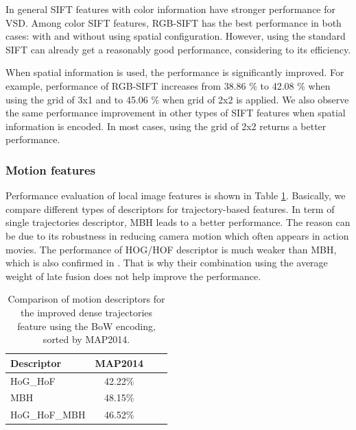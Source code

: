 \documentclass[twocolumn]{bmcart}%
\begin{document}
In general SIFT features with color information have stronger performance for VSD. Among color SIFT features, RGB-SIFT has the best performance in both cases: with and without using spatial configuration. However, using the standard SIFT can already get a reasonably good performance, considering to its efficiency. 

When spatial information is used, the performance is significantly improved. For example, performance of RGB-SIFT increases from 38.86 \%  to 42.08 \% when using the grid of 3x1 and to 45.06 \% when grid of 2x2 is applied. We also observe the same performance improvement in other types of SIFT features when spatial information is encoded. In most cases, using the grid of 2x2 returns a better performance. 

\subsubsection{Motion features}
Performance evaluation of local image features is shown in Table \ref{tab:motion_bow}. Basically, we compare different types of descriptors for trajectory-based features. In term of single trajectories descriptor, MBH leads to a better performance. The reason can be due to its robustness in reducing camera motion which often appears in action movies. The performance of HOG/HOF descriptor is much weaker than MBH, which is also confirmed in \cite{wang2013action}. That is why their combination using the average weight of late fusion does not help improve the performance.
\begin{table}
	\centering
	\caption{Comparison of motion descriptors for the improved dense trajectories feature using the BoW encoding, sorted by MAP2014.}
	\begin{tabular}{lccc}
		\hline
		Descriptor & MAP2014 \\ \hline
		HoG\_HoF & 42.22\% \\ 
		MBH   & 48.15\% \\
		HoG\_HoF\_MBH & 46.52\% \\ \hline
	\end{tabular}%
	\label{tab:motion_bow}%
\end{table}%
\end{document}
